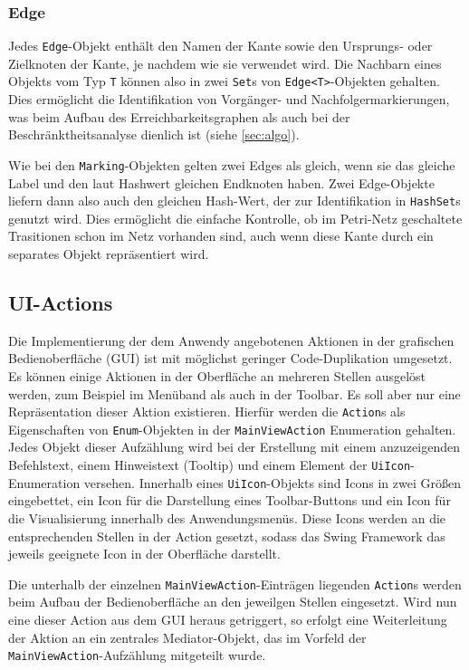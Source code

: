 \subsubsection{Edge}
Jedes \texttt{Edge}-Objekt enthält den Namen der Kante sowie den Ursprungs- oder
Zielknoten der Kante, je nachdem wie sie verwendet wird. Die Nachbarn eines
Objekts vom Typ \texttt{T} können also in zwei \texttt{Set}s von
\texttt{Edge<T>}-Objekten gehalten. Dies ermöglicht die Identifikation von
Vorgänger- und Nachfolgermarkierungen, was beim Aufbau des
Erreichbarkeitsgraphen als auch bei der Beschränktheitsanalyse dienlich ist
(siehe \cref{sec:algo}).

Wie bei den \texttt{Marking}-Objekten gelten zwei Edges als gleich, wenn sie das
gleiche Label und den laut Hashwert gleichen Endknoten haben. Zwei Edge-Objekte
liefern dann also auch den gleichen Hash-Wert, der zur Identifikation in
\texttt{HashSet}s genutzt wird. Dies ermöglicht die einfache Kontrolle, ob im
Petri-Netz geschaltete Trasitionen schon im Netz vorhanden sind, auch wenn diese
Kante durch ein separates Objekt repräsentiert wird.

\subsection{UI-Actions}
Die Implementierung der dem Anwendy angebotenen Aktionen in der grafischen
Bedienoberfläche (GUI) ist mit möglichst geringer Code-Duplikation umgesetzt. Es
können einige Aktionen in der Oberfläche an mehreren Stellen ausgelöst werden,
zum Beispiel im Menüband als auch in der Toolbar. Es soll aber nur eine
Repräsentation dieser Aktion existieren. Hierfür werden die \texttt{Action}s als
Eigenschaften von \texttt{Enum}-Objekten in der \texttt{MainViewAction}
Enumeration gehalten. Jedes Objekt dieser Aufzählung wird bei der Erstellung mit
einem anzuzeigenden Befehlstext, einem Hinweistext (Tooltip) und einem Element
der \texttt{UiIcon}-Enumeration versehen. Innerhalb eines
\texttt{UiIcon}-Objekts sind Icons in zwei Größen eingebettet, ein Icon für die
Darstellung eines Toolbar-Buttons und ein Icon für die Visualisierung innerhalb
des Anwendungsmenüs. Diese Icons werden an die entsprechenden Stellen in der
Action gesetzt, sodass das Swing Framework das jeweils geeignete Icon in der
Oberfläche darstellt.

Die unterhalb der einzelnen \texttt{MainViewAction}-Einträgen liegenden
\texttt{Action}s werden beim Aufbau der Bedienoberfläche an den jeweilgen
Stellen eingesetzt. Wird nun eine dieser Action aus dem GUI heraus getriggert,
so erfolgt eine Weiterleitung der Aktion an ein zentrales Mediator-Objekt, das
im Vorfeld der \texttt{MainViewAction}-Aufzählung mitgeteilt wurde.

